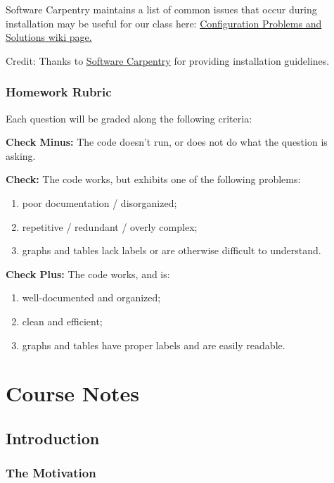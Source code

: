 \documentclass[]{book}
\providecommand{\tightlist}{%
  \setlength{\itemsep}{0pt}\setlength{\parskip}{0pt}}
\begin{document}
Software Carpentry maintains a list of common issues that occur during
installation may be useful for our class here:
\href{https://github.com/swcarpentry/workshop-template/wiki/Configuration-Problems-and-Solutions}{Configuration
Problems and Solutions wiki page.}

Credit: Thanks to
\href{http://software-carpentry.org/workshops/}{Software Carpentry} for
providing installation guidelines.

\section{Homework Rubric}\label{homework-rubric}

Each question will be graded along the following criteria:

\textbf{Check Minus:} The code doesn't run, or does not do what the
question is asking.

\textbf{Check:} The code works, but exhibits one of the following
problems:

\begin{enumerate}
\def\labelenumi{\arabic{enumi})}
\tightlist
\item
  poor documentation / disorganized;
\item
  repetitive / redundant / overly complex;
\item
  graphs and tables lack labels or are otherwise difficult to
  understand.
\end{enumerate}

\textbf{Check Plus:} The code works, and is:

\begin{enumerate}
\def\labelenumi{\arabic{enumi})}
\tightlist
\item
  well-documented and organized;
\item
  clean and efficient;
\item
  graphs and tables have proper labels and are easily readable.
\end{enumerate}

\part{Course Notes}\label{part-course-notes}

\chapter{Introduction}\label{introduction}

\section{The Motivation}\label{the-motivation}
\end{document}
